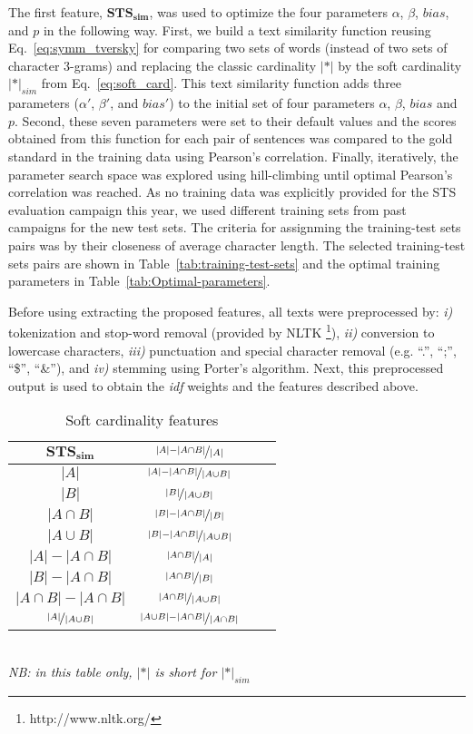 The first feature, $\mathbf{STS_{sim}}$, was used to optimize the four
parameters $\alpha$, $\beta$, $bias$, and $p$ in the following way.
First, we build a text similarity function reusing Eq.~\ref{eq:symm_tversky}
for comparing two sets of words (instead of two sets of character
3-grams) and replacing the classic cardinality $|*|$ by the soft
cardinality $|*|_{sim}$ from Eq.~\ref{eq:soft_card}. This text similarity
function adds three parameters ($\alpha'$, $\beta'$, and $bias'$) to
the initial set of four parameters $\alpha$, $\beta$, $bias$ and $p$.
Second, these seven parameters were set to their default values and the
scores obtained from this function for each pair of sentences was compared
to the gold standard in the training data using Pearson's correlation.
Finally, iteratively, the parameter search space was explored using
hill-climbing until optimal Pearson's correlation was reached. As no
training data was explicitly provided for the STS evaluation campaign
this year, we used different training sets from past campaigns for
the new test sets. The criteria for assignming the training-test
sets pairs was by their closeness of average character length.
The selected training-test sets pairs are shown in Table~\ref{tab:training-test-sets}
and the optimal training parameters in Table~\ref{tab:Optimal-parameters}.

Before using extracting the proposed features, all texts were preprocessed
by: \emph{i)} tokenization and stop-word removal (provided by NLTK%
\footnote{http://www.nltk.org/%
}), \emph{ii)} conversion to lowercase characters, \emph{iii)} punctuation
and special character removal (e.g. ``.'', ``;'', ``\$'', ``\&''),
and \emph{iv) }stemming using Porter's algorithm. Next, this preprocessed
output is used to obtain the \emph{idf} weights and the features described
above.

\begin{table}[t!]
\begin{centering}
\begin{tabular}{|c|c|c|c|}
\hline 
$\mathbf{STS_{sim}}$  & $\nicefrac{|A|-|A\cap B|}{|A|}$\tabularnewline
\hline 
{\small $|A|$} &  $\nicefrac{|A|-|A\cap B|}{|A\cup B|}$\tabularnewline
\hline 
{\small $|B|$} &  $\nicefrac{|B|}{|A\cup B|}$\tabularnewline
\hline 
{\small $|A\cap B|$} & $\nicefrac{|B|-|A\cap B|}{|B|}$\tabularnewline
\hline 
{\small $|A\cup B|$} &  $\nicefrac{|B|-|A\cap B|}{|A\cup B|}$\tabularnewline
\hline 
{\small $|A|-|A\cap B|$} & $\nicefrac{|A\cap B|}{|A|}$\tabularnewline
\hline 
{\small $|B|-|A\cap B|$}  & $\nicefrac{|A\cap B|}{|B|}$\tabularnewline
\hline 
{\small $|A\cap B|-|A\cap B|$} & $\nicefrac{|A\cap B|}{|A\cup B|}$\tabularnewline
\hline 
$\nicefrac{|A|}{|A\cup B|}$ & $\nicefrac{|A\cup B|-|A\cap B|}{|A\cap B|}$\tabularnewline
\hline
\end{tabular}
\\[1ex]
{\hfill\em\footnotesize NB: in this table only, $|*|$ is short for $|*|_{sim}$\hfill}
\end{centering}
\caption{Soft cardinality features\label{tab:features}}
\end{table}


